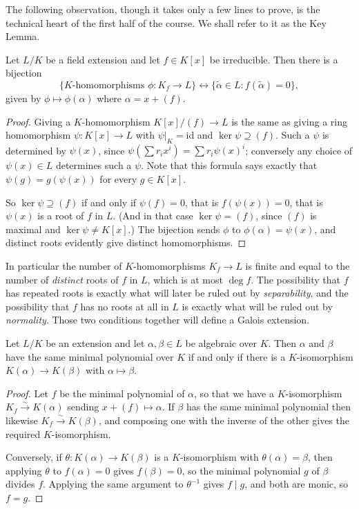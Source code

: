 \documentclass[a4paper]{scrartcl}
\begin{document}
The following observation, though it takes only a few lines to prove, is the technical heart of the first half of the course. We shall refer to it as the Key Lemma.

\begin{lemma}\label{lem:key}
	Let $L/K$ be a field extension and let $f \in K[x]$ be irreducible. Then there is a bijection
	$$\{K\text{-homomorphisms } \phi : K_f \to L\} \longleftrightarrow \{\tilde\alpha \in L : f(\tilde\alpha) = 0\},$$
	given by $\phi \mapsto \phi(\alpha)$ where $\alpha = x + (f)$.
\end{lemma}

\begin{proof}
	Giving a $K$-homomorphism $K[x]/(f) \to L$ is the same as giving a ring homomorphism $\psi : K[x] \to L$ with $\psi|_K = \mathrm{id}$ and $\ker \psi \supseteq (f)$. Such a $\psi$ is determined by $\psi(x)$, since $\psi(\sum r_i x^i) = \sum r_i \psi(x)^i$; conversely any choice of $\psi(x) \in L$ determines such a $\psi$. Note that this formula says exactly that $\psi(g) = g(\psi(x))$ for every $g \in K[x]$.

	So $\ker\psi \supseteq (f)$ if and only if $\psi(f) = 0$, that is $f(\psi(x)) = 0$, that is $\psi(x)$ is a root of $f$ in $L$. (And in that case $\ker\psi = (f)$, since $(f)$ is maximal and $\ker \psi \neq K[x]$.) The bijection sends $\phi$ to $\phi(\alpha) = \psi(x)$, and distinct roots evidently give distinct homomorphisms.
\end{proof}

In particular the number of $K$-homomorphisms $K_f \to L$ is finite and equal to the number of \emph{distinct} roots of $f$ in $L$, which is at most $\deg f$. The possibility that $f$ has repeated roots is exactly what will later be ruled out by \emph{separability}, and the possibility that $f$ has no roots at all in $L$ is exactly what will be ruled out by \emph{normality}. Those two conditions together will define a Galois extension.

\begin{corollary}\label{cor:sameminpoly}
	Let $L/K$ be an extension and let $\alpha, \beta \in L$ be algebraic over $K$. Then $\alpha$ and $\beta$ have the same minimal polynomial over $K$ if and only if there is a $K$-isomorphism $K(\alpha) \to K(\beta)$ with $\alpha \mapsto \beta$.
\end{corollary}

\begin{proof}
	Let $f$ be the minimal polynomial of $\alpha$, so that we have a $K$-isomorphism $K_f \xrightarrow{\sim} K(\alpha)$ sending $x + (f) \mapsto \alpha$. If $\beta$ has the same minimal polynomial then likewise $K_f \xrightarrow{\sim} K(\beta)$, and composing one with the inverse of the other gives the required $K$-isomorphism.

	Conversely, if $\theta : K(\alpha) \to K(\beta)$ is a $K$-isomorphism with $\theta(\alpha) = \beta$, then applying $\theta$ to $f(\alpha) = 0$ gives $f(\beta) = 0$, so the minimal polynomial $g$ of $\beta$ divides $f$. Applying the same argument to $\theta^{-1}$ gives $f \mid g$, and both are monic, so $f = g$.
\end{proof}
\end{document}
